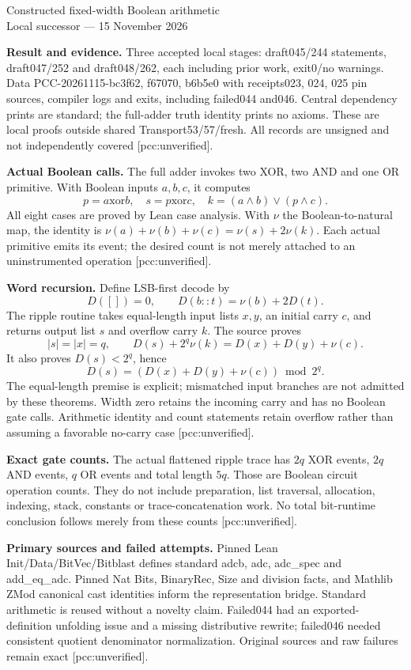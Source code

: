 \documentclass[10pt]{article}
\begin{document}
\begin{center}{\Large Constructed fixed-width Boolean arithmetic}\\[4pt]
Local successor --- 15 November 2026\end{center}
\textbf{Result and evidence.} Three accepted local stages: draft045/244 statements, 
draft047/252 and draft048/262, each including prior work, exit0/no warnings.
Data PCC-20261115-bc3f62, f67070, b6b5e0 with receipts023, 024, 025 pin sources, 
compiler logs and exits, including failed044 and046. Central dependency prints
are standard; the full-adder truth identity prints no axioms. These are local
proofs outside shared Transport53/57/fresh. All records are unsigned and
not independently covered [pcc:unverified].

\textbf{Actual Boolean calls.} The full adder invokes two XOR, two AND and one
OR primitive. With Boolean inputs $a, b, c$, it computes
\[
 p=a\mathbin{\mathrm{xor}}b, \quad s=p\mathbin{\mathrm{xor}}c, \quad
 k=(a\land b)\lor(p\land c).
\]
All eight cases are proved by Lean case analysis. With $\nu$ the Boolean-to-natural
map, the identity is $\nu(a)+\nu(b)+\nu(c)=\nu(s)+2\nu(k)$.
Each actual primitive emits its event; the desired count is not merely attached
to an uninstrumented operation [pcc:unverified].

\textbf{Word recursion.} Define LSB-first decode by
\[
 D([])=0, \qquad D(b::t)=\nu(b)+2D(t).
\]
The ripple routine takes equal-length input lists $x, y$, an initial carry $c$, 
and returns output list $s$ and overflow carry $k$. The source proves
\[
 |s|=|x|=q, \qquad D(s)+2^q\nu(k)=D(x)+D(y)+\nu(c).
\]
It also proves $D(s)<2^q$, hence
\[
 D(s)=(D(x)+D(y)+\nu(c))\bmod2^q.
\]
The equal-length premise is explicit; mismatched input branches are not admitted
by these theorems. Width zero retains the incoming carry and has no Boolean
gate calls. Arithmetic identity and count statements retain overflow rather
than assuming a favorable no-carry case [pcc:unverified].

\textbf{Exact gate counts.} The actual flattened ripple trace has
$2q$ XOR events, $2q$ AND events, $q$ OR events and total length $5q$.
Those are Boolean circuit operation counts. They do not include preparation, 
list traversal, allocation, indexing, stack, constants or trace-concatenation work.
No total bit-runtime conclusion follows merely from these counts
[pcc:unverified].

\textbf{Primary sources and failed attempts.} Pinned Lean
Init/Data/BitVec/Bitblast defines standard adcb, adc, adc\_spec and add\_eq\_adc.
Pinned Nat Bits, BinaryRec, Size and division facts, and Mathlib ZMod canonical
cast identities inform the representation bridge. Standard arithmetic is
reused without a novelty claim. Failed044 had an exported-definition unfolding
issue and a missing distributive rewrite; failed046 needed consistent quotient
denominator normalization. Original sources and raw failures remain exact
[pcc:unverified].
\end{document}
